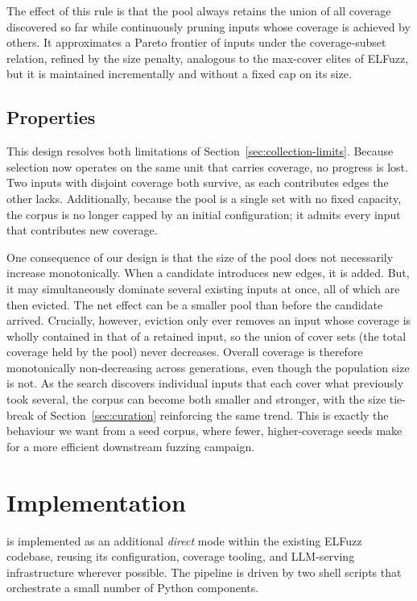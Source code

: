 The effect of this rule is that the pool always retains the union of all coverage discovered so far while continuously pruning inputs whose coverage is achieved by others. It approximates a Pareto frontier of inputs under the coverage-subset relation, refined by the size penalty, analogous to the max-cover elites of ELFuzz, but it is maintained incrementally and without a fixed cap on its size.

\subsection{Properties}
\label{sec:population}

This design resolves both limitations of Section~\ref{sec:collection-limits}. Because selection now operates on the same unit that carries coverage, no progress is lost. Two inputs with disjoint coverage both survive, as each contributes edges the other lacks. Additionally, because the pool is a single set with no fixed capacity, the corpus is no longer capped by an initial configuration; it admits every input that contributes new coverage.

One consequence of our design is that the size of the pool does not necessarily increase monotonically. When a candidate introduces new edges, it is added. But, it may simultaneously dominate several existing inputs at once, all of which are then evicted. The net effect can be a smaller pool than before the candidate arrived. Crucially, however, eviction only ever removes an input whose coverage is wholly contained in that of a retained input, so the union of cover sets (the total coverage held by the pool) never decreases. Overall coverage is therefore monotonically non-decreasing across generations, even though the population size is not. As the search discovers individual inputs that each cover what previously took several, the corpus can become both smaller and stronger, with the size tie-break of Section~\ref{sec:curation} reinforcing the same trend. This is exactly the behaviour we want from a seed corpus, where fewer, higher-coverage seeds make for a more efficient downstream fuzzing campaign.

\section{Implementation}

\toolname{} is implemented as an additional \textit{direct} mode within the existing ELFuzz codebase, reusing its configuration, coverage tooling, and LLM-serving infrastructure wherever possible. The pipeline is driven by two shell scripts that orchestrate a small number of Python components.

